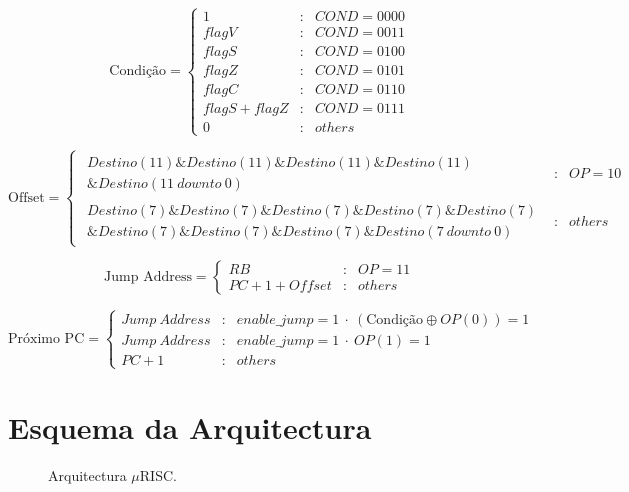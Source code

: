 \[\text{Condição}=\left\{
\begin{array}{rcl}
1 & : & COND=0000\\
flagV & : & COND=0011\\
flagS & : & COND=0100\\
flagZ & : & COND=0101\\
flagC & : &  COND=0110\\
flagS+flagZ & : & COND=0111\\
0 & : & others
\end{array}\right.\]

\[\text{Offset}=\left\{
\begin{array}{rcl}
\begin{array}{r}
Destino(11) \&Destino(11) \&Destino(11) \&Destino(11)\\
\&Destino(11\ downto\ 0)
\end{array} & : & OP=10\\
\begin{array}{r}
Destino(7)\&Destino(7)\&Destino(7)\&Destino(7)\&Destino(7)\\
\&Destino(7)\&Destino(7)\&Destino(7)\&Destino(7\ downto\ 0)
\end{array} & : & others
\end{array}\right.\]

\[\text{Jump Address}=\left\{
\begin{array}{rcl}
RB & : & OP=11\\
PC+1+Offset & : & others
\end{array}\right.\]

\[\text{Próximo PC}=\left\{
\begin{array}{rcl}
Jump\ Address & : & enable\_jump=1\ \cdot\ (\text{Condição} \oplus OP(0))=1\\
Jump\ Address & : & enable\_jump=1\ \cdot\ OP(1)=1\\
PC+1 & : & others
\end{array}\right.\]

\section{Esquema da Arquitectura}

\begin{figure}[H]
	\begin{center}
		\caption{Arquitectura $\mu$RISC.}
		\label{arquit}
	\end{center}
\end{figure}